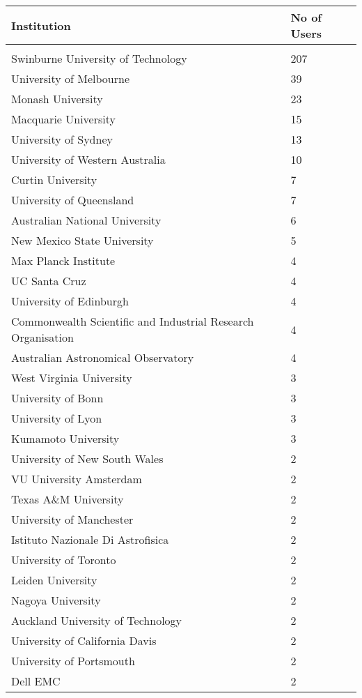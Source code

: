 \documentclass{article}%
\begin{document}
%
\begin{longtabu}{X[l] X[r]}%
\textbf{Institution}&\textbf{No of Users}\\%
\hline%
&\\%
Swinburne University of Technology&207\\%
\hline%
University of Melbourne&39\\%
\hline%
Monash University&23\\%
\hline%
Macquarie University&15\\%
\hline%
University of Sydney&13\\%
\hline%
University of Western Australia&10\\%
\hline%
Curtin University&7\\%
\hline%
University of Queensland&7\\%
\hline%
Australian National University&6\\%
\hline%
New Mexico State University&5\\%
\hline%
Max Planck Institute&4\\%
\hline%
UC Santa Cruz&4\\%
\hline%
University of Edinburgh&4\\%
\hline%
Commonwealth Scientific and Industrial Research Organisation&4\\%
\hline%
Australian Astronomical Observatory&4\\%
\hline%
West Virginia University&3\\%
\hline%
University of Bonn&3\\%
\hline%
University of Lyon&3\\%
\hline%
Kumamoto University&3\\%
\hline%
University of New South Wales&2\\%
\hline%
VU University Amsterdam&2\\%
\hline%
Texas A\&M University&2\\%
\hline%
University of Manchester&2\\%
\hline%
Istituto Nazionale Di Astrofisica&2\\%
\hline%
University of Toronto&2\\%
\hline%
Leiden University&2\\%
\hline%
Nagoya University&2\\%
\hline%
Auckland University of Technology&2\\%
\hline%
University of California Davis&2\\%
\hline%
University of Portsmouth&2\\%
\hline%
Dell EMC&2\\%

\end{longtabu}
\end{document}
